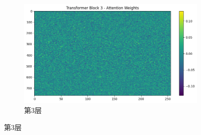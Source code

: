 \begin{figure}[H]
\begin{subfigure}{0.3\textwidth}
        \includegraphics[width=\linewidth]{../output/transformer/with scheduler/Transformer Block 3 Attention Weights.png}
        \caption{第3层}
        \label{fig:transformerblock3attentionweightswithscheduler}
    \end{subfigure}

    \vfill


\end{figure}

